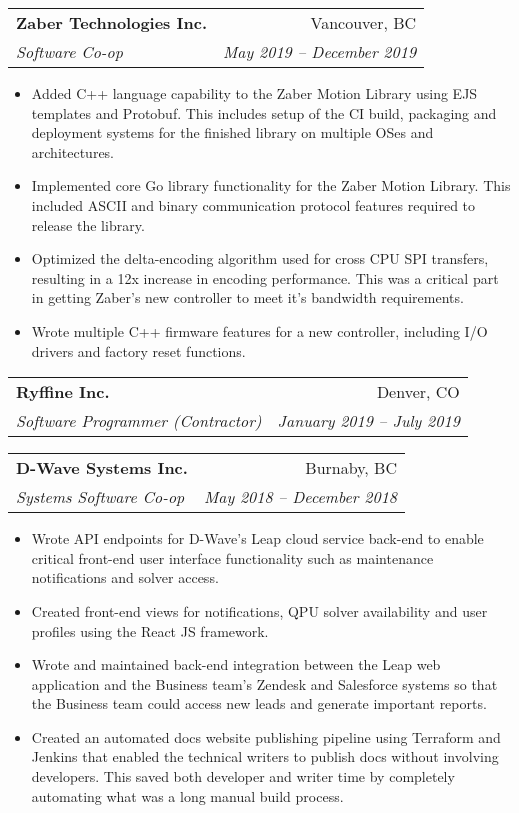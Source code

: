 \documentclass[letterpaper,11pt]{article}
\makeatletter
\newcommand{\resumeItem}[2]{
  \item\small{
    \textbf{#1}{#2 \vspace{-2pt}}
  }
}
\newcommand{\resumeSubheading}[4]{
  \vspace{-1pt}\item
    \begin{tabular*}{0.97\textwidth}[t]{l@{\extracolsep{\fill}}r}
      \textbf{#1} & #2 \\
      \textit{\small#3} & \textit{\small #4} \\
    \end{tabular*}\vspace{-5pt}
}
\newcommand{\resumeItemListStart}{\begin{itemize}}
\newcommand{\resumeItemListEnd}{\end{itemize}\vspace{-5pt}}
\makeatother
\begin{document}
    \resumeSubheading
      {Zaber Technologies Inc.}{Vancouver, BC}
      {Software Co-op}{May 2019 -- December 2019}
      \resumeItemListStart
        \resumeItem{} {Added C++ language capability to the Zaber Motion Library using EJS templates and Protobuf. This includes setup of the CI build, packaging and deployment systems for the finished library on multiple OSes and architectures.}
        \resumeItem{} {Implemented core Go library functionality for the Zaber Motion Library. This included ASCII and binary communication protocol features required to release the library.}
        \resumeItem{} {Optimized the delta-encoding algorithm used for cross CPU SPI transfers, resulting in a 12x increase in encoding performance. This was a critical part in getting Zaber's new controller to meet it's bandwidth requirements.}
        \resumeItem{} {Wrote multiple C++ firmware features for a new controller, including I/O drivers and factory reset functions.}
      \resumeItemListEnd

    \resumeSubheading
      {Ryffine Inc.}{Denver, CO}
      {Software Programmer (Contractor)}{January 2019 -- July 2019}
      \resumeItemListStart
      \resumeItemListEnd

    \resumeSubheading
      {D-Wave Systems Inc.}{Burnaby, BC}
      {Systems Software Co-op}{May 2018 -- December 2018}
      \resumeItemListStart
        \resumeItem{} {Wrote API endpoints for D-Wave's Leap cloud service back-end to enable critical front-end user interface functionality such as maintenance notifications and solver access.}
        \resumeItem{} {Created front-end views for notifications, QPU solver availability and user profiles using the React JS framework.}
        \resumeItem{} {Wrote and maintained back-end integration between the Leap web application and the Business team's Zendesk and Salesforce systems so that the Business team could access new leads and generate important reports.}
        \resumeItem{} {Created an automated docs website publishing pipeline using Terraform and Jenkins that enabled the technical writers to publish docs without involving developers. This saved both developer and writer time by completely automating what was a long manual build process.}
      \resumeItemListEnd
\end{document}
